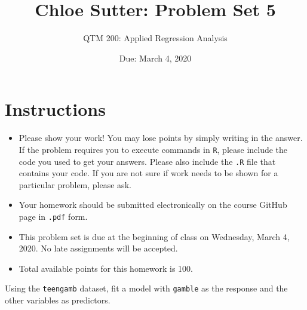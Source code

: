 \documentclass[12pt,letterpaper]{article}
\title{Chloe Sutter: Problem Set 5}
\date{Due: March 4, 2020}
\author{QTM 200: Applied Regression Analysis}
\begin{document}
	\maketitle
	
	\section*{Instructions}
	\begin{itemize}
		\item Please show your work! You may lose points by simply writing in the answer. If the problem requires you to execute commands in \texttt{R}, please include the code you used to get your answers. Please also include the \texttt{.R} file that contains your code. If you are not sure if work needs to be shown for a particular problem, please ask.
		\item Your homework should be submitted electronically on the course GitHub page in \texttt{.pdf} form.
		\item This problem set is due at the beginning of class on Wednesday, March 4, 2020. No late assignments will be accepted.
		\item Total available points for this homework is 100.
	\end{itemize}
	
		\vspace{.5cm}
	
\noindent  Using the \texttt{teengamb} dataset, fit a model with \texttt{gamble} as the response and the other variables as predictors. 

\vspace{.5cm}
  
\vspace{.5cm}
\end{document}
